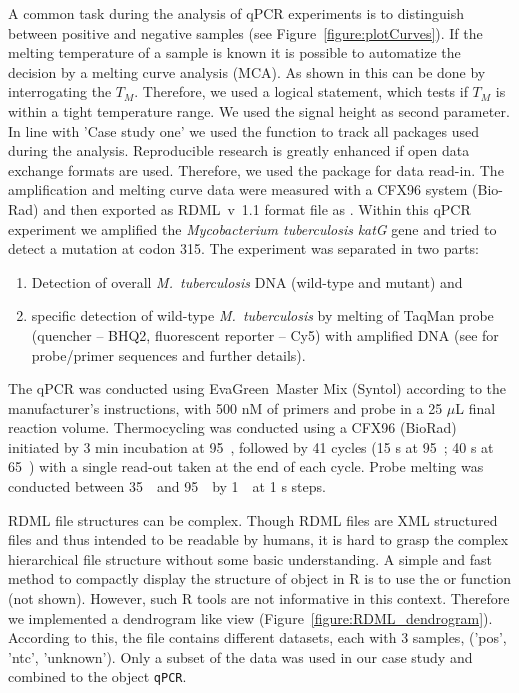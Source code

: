 A common task during the analysis of qPCR experiments is to distinguish between 
positive and negative samples (see Figure~\ref{figure:plotCurves}). If the 
melting temperature of a sample is known it is possible to automatize the 
decision by a melting curve analysis (MCA). As shown in \citet{roediger_RJ_2013} 
this can be done by interrogating the $T_{M}$. Therefore, we used a logical 
statement, which tests if $T_{M}$ is within a tight temperature range. We used 
the signal height as second parameter. In line with 'Case study one' we used 
the function  to track all packages used during the analysis. 
Reproducible research is greatly enhanced if open data exchange formats are 
used. Therefore, we used the  package for data read-in. The 
amplification and melting curve data were measured with a CFX96 system (Bio-Rad) 
and then exported as RDML~v~1.1 format file as . 
Within this qPCR experiment we amplified the \textit{Mycobacterium tuberculosis} 
\textit{katG} gene and tried to detect a mutation at codon 315. The experiment 
was separated in two parts:

\begin{enumerate}
 \item Detection of overall \textit{M.~tuberculosis} DNA (wild-type 
and mutant) and
 \item specific detection of wild-type \textit{M.~tuberculosis} by melting of 
TaqMan probe (quencher -- BHQ2, fluorescent reporter -- Cy5) with amplified DNA 
(see \citet{luo_multiplex_2011} for probe/primer sequences and further details).
\end{enumerate}

The qPCR was conducted using EvaGreen\circledR~Master Mix (Syntol) according to 
the manufacturer's instructions, with 500 nM of primers and probe in a 25 $\mu$L 
final reaction volume. Thermocycling was conducted using a CFX96 (BioRad) 
initiated by 3 min incubation at 95~\textcelsius, followed by 41 cycles (15 s at 
95~\textcelsius; 40 s at 65~\textcelsius) with a single read-out taken at the 
end of each cycle. Probe melting was conducted between 35~\textcelsius~and 
95~\textcelsius~by 1~\textcelsius~at 1 s steps.

RDML file structures can be complex. Though RDML files are XML 
structured files and thus intended to be readable by humans, it is hard to grasp 
the complex hierarchical file structure without some basic understanding. A 
simple and fast method to compactly display the structure of object in R is to 
use the  or  function (not shown). However, such R tools 
are not informative in this context. Therefore we implemented a dendrogram like 
view (Figure~\ref{figure:RDML_dendrogram}). According to this, the file contains 
different datasets, each with 3 samples, ('pos',  'ntc', 'unknown'). Only a 
subset of the data was used in our case study and combined to the object 
\texttt{qPCR}.

